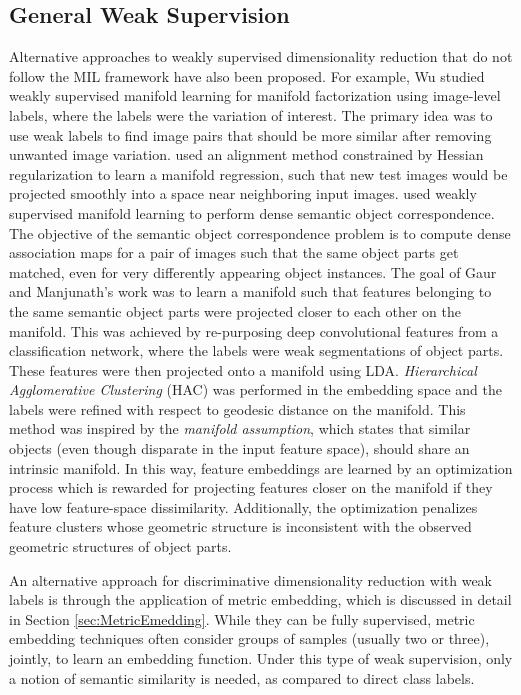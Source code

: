 \subsection{General Weak Supervision}
Alternative approaches to weakly supervised dimensionality reduction that do not follow the MIL framework have also been proposed.  For example, Wu studied weakly supervised manifold learning for manifold factorization using image-level labels, where the labels were the variation of interest.  The primary idea was to use weak labels to find image pairs that should be more similar after removing unwanted image variation.  \cite{Wu2015MILImageManifoldThesis} used an alignment method constrained by Hessian regularization to learn a manifold regression, such that new test images would be projected smoothly into a space near neighboring input images.  \cite{Gaur2017MILSemanticObjectCorrespondence} used weakly supervised manifold learning to perform dense semantic object correspondence. The objective of the semantic object correspondence problem is to compute dense association maps for a pair of images such that the same object parts get matched, even for very differently appearing object instances. The goal of Gaur and Manjunath's work was to learn a manifold such that features belonging to the same semantic object parts were projected closer to each other on the manifold. This was achieved by re-purposing deep convolutional features from a classification network, where the labels were weak segmentations of object parts.  These features were then projected onto a manifold using LDA. \textit{Hierarchical Agglomerative Clustering} (HAC) was performed in the embedding space and the labels were refined with respect to geodesic distance on the manifold.  This method was inspired by the \textit{manifold assumption}, which states that similar objects (even though disparate in the input feature space), should share an intrinsic manifold.  In this way, feature embeddings are learned by an optimization process which is rewarded for projecting features closer on the manifold if they have low feature-space dissimilarity.  Additionally, the optimization penalizes feature clusters whose geometric structure is inconsistent with the observed geometric structures of object parts.  

An alternative approach for discriminative dimensionality reduction with weak labels is through the application of metric embedding, which is discussed in detail in Section \ref{sec:MetricEmedding}.  While they can be fully supervised, metric embedding techniques often consider groups of samples (usually two or three), jointly, to learn an embedding function.  Under this type of weak supervision, only a notion of semantic similarity is needed,  as compared to direct class labels. 


